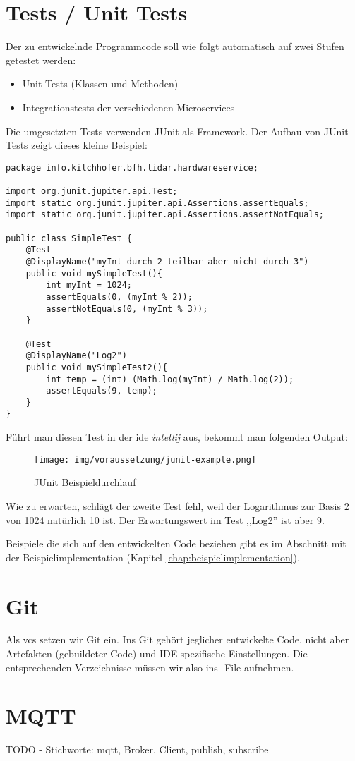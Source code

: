 \section{Tests / Unit Tests}
Der zu entwickelnde Programmcode soll wie folgt automatisch auf zwei Stufen getestet werden:
\begin{itemize}
	\item Unit Tests (Klassen und Methoden)
	\item Integrationstests der verschiedenen Microservices
\end{itemize}
Die umgesetzten Tests verwenden JUnit als Framework.  Der Aufbau von JUnit Tests zeigt dieses kleine Beispiel:
\begin{lstlisting}[caption={Simples Beispiel wie JUnit funktioniert},label={lst:junit-example-simple}]
package info.kilchhofer.bfh.lidar.hardwareservice;

import org.junit.jupiter.api.Test;
import static org.junit.jupiter.api.Assertions.assertEquals;
import static org.junit.jupiter.api.Assertions.assertNotEquals;

public class SimpleTest {
	@Test
	@DisplayName("myInt durch 2 teilbar aber nicht durch 3")
	public void mySimpleTest(){
		int myInt = 1024;
		assertEquals(0, (myInt % 2));
		assertNotEquals(0, (myInt % 3));
	}
	
	@Test
	@DisplayName("Log2")
	public void mySimpleTest2(){
		int temp = (int) (Math.log(myInt) / Math.log(2));
		assertEquals(9, temp);
	}
}
\end{lstlisting}
Führt man diesen Test in der \acrshort{ide} \textit{\Gls{intellij}} aus, bekommt man folgenden Output:
\begin{figure}[H]
	\centering
	\texttt{[image: img/voraussetzung/junit-example.png]}
	\caption{JUnit Beispieldurchlauf}
	\label{fig:junit-example}
\end{figure}
Wie zu erwarten, schlägt der zweite Test fehl, weil der Logarithmus zur Basis 2 von 1024 natürlich 10 ist. Der Erwartungswert im Test ,,Log2'' ist aber 9.

Beispiele die sich auf den entwickelten Code beziehen gibt es im Abschnitt mit der Beispielimplementation (Kapitel \ref{chap:beispielimplementation}).

\section{Git}
Als \acrshort{vcs} setzen wir Git ein. Ins Git gehört jeglicher entwickelte Code, nicht aber Artefakten (gebuildeter Code) und IDE spezifische Einstellungen. Die entsprechenden Verzeichnisse müssen wir also ins -File aufnehmen.

\section{MQTT}
\label{sec:mqtt}
TODO - Stichworte: \acrshort{mqtt}, Broker, Client, publish, subscribe
